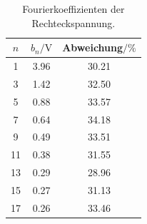 \noindent
%
\begin{table}[H]
    \caption{Fourierkoeffizienten der Rechteckspannung.}
    \label{tab:rechteck}
    \centering
    \begin{tabular}{S[table-format=2.0(0)e0] S[table-format=1.2(0)e0] S[table-format=2.2]}
        \toprule
        {$n$} & {$b_n/\si{\volt}$} & {Abweichung$/\si{\percent}$}\\
          & 3.96 & 30.21 \\
        3  & 1.42 & 32.50 \\
        5  & 0.88 & 33.57 \\
        7  & 0.64 & 34.18 \\
        9  & 0.49 & 33.51 \\
        11 & 0.38 & 31.55 \\
        13 & 0.29 & 28.96 \\
        15 & 0.27 & 31.13 \\
        17 & 0.26 & 33.46 \\
        \bottomrule
    \end{tabular}
\end{table}
\noindent
%

